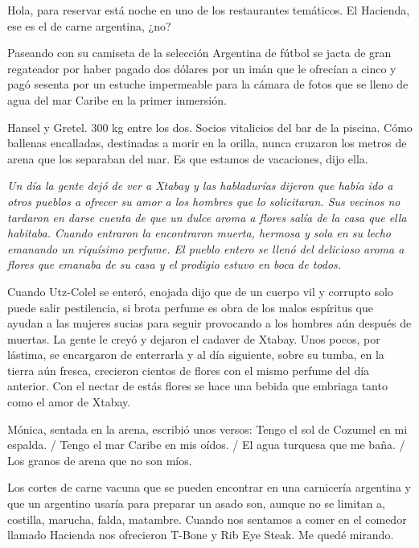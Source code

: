 \documentclass[11pt,twoside,openright,a6paper]{book}
\begin{document}
\vspace{1.5cm}
Hola, para reservar está noche en uno de los restaurantes temáticos. El Hacienda, ese es el de carne argentina, ¿no?


\vspace{1.5cm}
Paseando con su camiseta de la selección Argentina de fútbol se jacta de gran regateador por haber pagado dos dólares por un imán que le ofrecían a cinco y pagó sesenta por un estuche impermeable para la cámara de fotos que se lleno de agua del mar Caribe en la primer inmersión.


\vspace{1.5cm}
Hansel y Gretel. 300 kg entre los dos. Socios vitalicios del bar de la piscina. Cómo ballenas encalladas, destinadas a morir en la orilla, nunca cruzaron los metros de arena que los separaban del mar. Es que estamos de vacaciones, dijo ella.


\vspace{1.5cm}
{\em Un día la gente dejó de ver a Xtabay y las habladurías dijeron que había ido a otros pueblos a ofrecer su amor a los hombres que lo solicitaran. Sus vecinos no tardaron en darse cuenta de que un dulce aroma a flores salía de la casa que ella habitaba. Cuando entraron la encontraron muerta, hermosa y sola en su lecho emanando un riquísimo perfume. El pueblo entero se llenó del delicioso aroma a flores que emanaba de su casa y el prodigio estuvo en boca de todos. 

Cuando Utz-Colel se enteró, enojada dijo que de un cuerpo vil y corrupto solo puede salir pestilencia, si brota perfume es obra de los malos espíritus que ayudan a las mujeres sucias para seguir provocando a los hombres aún después de muertas. La gente le creyó y dejaron el cadaver de Xtabay. Unos pocos, por lástima, se encargaron de enterrarla y al día siguiente, sobre su tumba, en la tierra aún fresca, crecieron cientos de flores con el mismo perfume del día anterior. Con el nectar de estás flores se hace una bebida que embriaga tanto como el amor de Xtabay.}


\vspace{1.5cm}
Mónica, sentada en la arena, escribió unos versos: Tengo el sol de Cozumel en mi espalda. / Tengo el mar Caribe en mis oídos. / El agua turquesa que me baña. / Los granos de arena que no son míos.


\vspace{1.5cm}
Los cortes de carne vacuna que se pueden encontrar en una carnicería argentina y que un argentino usaría para preparar un asado son, aunque no se limitan a, costilla, marucha, falda, matambre. Cuando nos sentamos a comer en el comedor llamado Hacienda nos ofrecieron T-Bone y Rib Eye Steak. Me quedé mirando.
\end{document}
